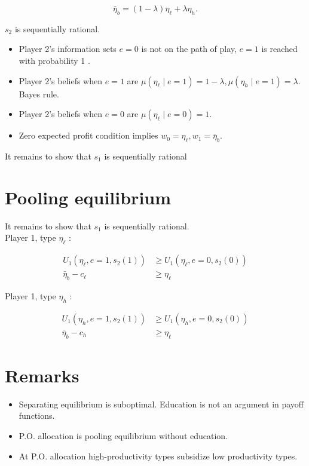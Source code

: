 \documentclass[10pt]{article}
\begin{document}
$$
\bar{\eta}_{b}=(1-\lambda) \eta_{\ell}+\lambda \eta_{h} .
$$

$s_{2}$ is sequentially rational.

\begin{itemize}
  \item Player 2's information sets $e=0$ is not on the path of play, $e=1$ is reached with probability 1 .
  \item Player 2's beliefs when $e=1$ are $\mu\left(\eta_{\ell} \mid e=1\right)=1-\lambda, \mu\left(\eta_{h} \mid e=1\right) =\lambda$. Bayes rule.
  \item Player 2's beliefs when $e=0$ are $\mu\left(\eta_{\ell} \mid e=0\right)=1$.
  \item Zero expected profit condition implies $w_{0}=\eta_{\ell}, w_{1}=\bar{\eta}_{b}$.
\end{itemize}

It remains to show that $s_{1}$ is sequentially rational

\section*{Pooling equilibrium}
It remains to show that $s_{1}$ is sequentially rational.\\
Player 1, type $\eta_{\ell}$ :

$$
\begin{aligned}
U_{1}\left(\eta_{\ell}, e=1, s_{2}(1)\right) & \geq U_{1}\left(\eta_{\ell}, e=0, s_{2}(0)\right) \\
\bar{\eta}_{b}-c_{\ell} & \geq \eta_{\ell}
\end{aligned}
$$

Player 1, type $\eta_{h}$ :

$$
\begin{aligned}
U_{1}\left(\eta_{h}, e=1, s_{2}(1)\right) & \geq U_{1}\left(\eta_{h}, e=0, s_{2}(0)\right) \\
\bar{\eta}_{b}-c_{h} & \geq \eta_{\ell}
\end{aligned}
$$

\section*{Remarks}
\begin{itemize}
  \item Separating equilibrium is suboptimal. Education is not an argument in payoff functions.
  \item P.O. allocation is pooling equilibrium without education.
  \item At P.O. allocation high-productivity types subsidize low productivity types.
\end{itemize}
\end{document}
